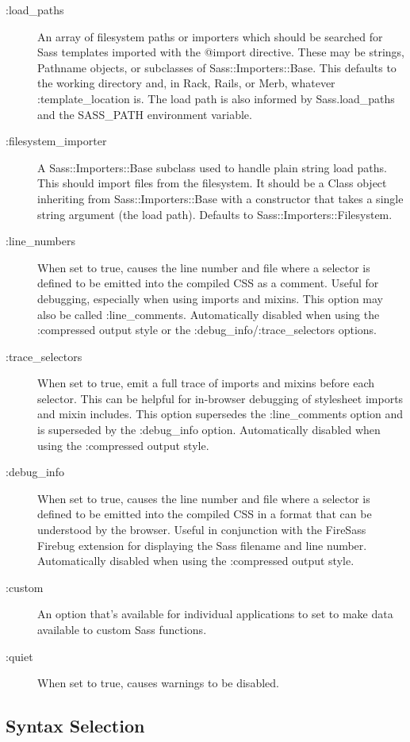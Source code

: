 \documentclass[9pt]{article}
\begin{document}
\begin{description}
\item[:load\_paths]An array of filesystem paths or importers which should be searched for Sass templates imported with the @import directive. These may be strings, Pathname objects, or subclasses of Sass::Importers::Base. This defaults to the working directory and, in Rack, Rails, or Merb, whatever :template\_location is. The load path is also informed by Sass.load\_paths and the SASS\_PATH environment variable.
\item[:filesystem\_importer]A Sass::Importers::Base subclass used to handle plain string load paths. This should import files from the filesystem. It should be a Class object inheriting from Sass::Importers::Base with a constructor that takes a single string argument (the load path). Defaults to Sass::Importers::Filesystem.
\item[:line\_numbers]When set to true, causes the line number and file where a selector is defined to be emitted into the compiled CSS as a comment. Useful for debugging, especially when using imports and mixins. This option may also be called :line\_comments. Automatically disabled when using the :compressed output style or the :debug\_info/:trace\_selectors options.
\item[:trace\_selectors]When set to true, emit a full trace of imports and mixins before each selector. This can be helpful for in-browser debugging of stylesheet imports and mixin includes. This option supersedes the :line\_comments option and is superseded by the :debug\_info option. Automatically disabled when using the :compressed output style.
\item[:debug\_info]When set to true, causes the line number and file where a selector is defined to be emitted into the compiled CSS in a format that can be understood by the browser. Useful in conjunction with the FireSass Firebug extension for displaying the Sass filename and line number. Automatically disabled when using the :compressed output style.
\item[:custom]An option that’s available for individual applications to set to make data available to custom Sass functions.
\item[:quiet]When set to true, causes warnings to be disabled.

\end{description}
\subsection{Syntax Selection}
\end{document}
